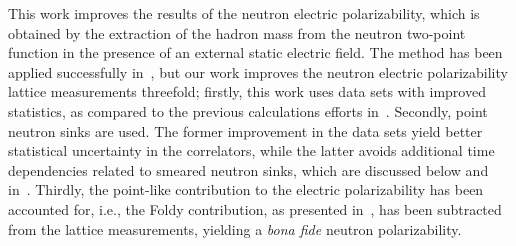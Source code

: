 This work improves the results of the neutron electric polarizability, which is obtained by the extraction of the hadron mass from the neutron two-point function in the presence of an external static electric field. The method has been applied successfully in~\cite{Engelhardt:2007ub, Engelhardt:2009ryp},
but our work improves the neutron electric polarizability lattice measurements
threefold; firstly, this work uses data sets with improved statistics, as compared to the previous calculations efforts in~\cite{Engelhardt:2007ub, Engelhardt:2009ryp}. Secondly, point neutron sinks are used. The former improvement
 in the data sets yield better statistical uncertainty in the correlators, while the latter
 avoids additional time dependencies related to smeared neutron sinks, which are discussed below
 and in~\cite{Engelhardt:2007ub}. Thirdly, the point-like contribution to the 
 electric polarizability has been accounted for, i.e., the Foldy contribution, 
 as presented in~\cite{Saenz:2020yxy}, has been subtracted from the lattice measurements, 
 yielding a \textit{bona fide} neutron polarizability.
 
